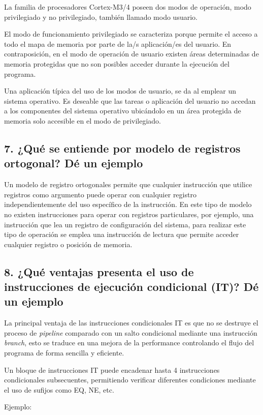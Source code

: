 \documentclass[10pt,a4paper,twoside,spanish]{article}	%
\begin{document}
La familia de procesadores Cortex-M3/4 poseen dos modos de operación, modo privilegiado y no privilegiado, también llamado modo usuario.

El modo de funcionamiento privilegiado se caracteriza porque permite el acceso a todo el mapa de memoria por parte de la/s aplicación/es del usuario. En contraposición, en el modo de operación de usuario existen áreas determinadas de memoria protegidas que no son posibles acceder durante la ejecución del programa.

Una aplicación típica del uso de los modos de usuario, se da al emplear un sistema operativo. Es deseable que las tareas o aplicación del usuario no accedan a los componentes del sistema operativo ubicándolo en un área protegida de memoria solo accesible en el modo de privilegiado.     

\subsection*{7. ¿Qué se entiende por modelo de registros ortogonal? Dé un ejemplo}

Un modelo de registro ortogonales permite que cualquier instrucción que utilice registros como argumento puede operar con cualquier registro independientemente del uso específico de la instrucción. En este tipo de modelo no existen instrucciones para operar con registros particulares, por ejemplo, una instrucción que lea un registro de configuración del sistema, para realizar este tipo de operación se emplea una instrucción de lectura que permite acceder cualquier registro o posición de memoria.


\subsection*{8. ¿Qué ventajas presenta el uso de instrucciones de ejecución condicional (IT)? Dé un ejemplo}

La principal ventaja de las instrucciones condicionales IT es que no se destruye el proceso de \textit{pipeline} comparado con un salto condicional mediante una instrucción \textit{branch}, esto se traduce en una mejora de la performance controlando el flujo del programa de forma sencilla y eficiente.

Un bloque de instrucciones IT puede encadenar hasta 4 instrucciones condicionales subsecuentes, permitiendo verificar diferentes condiciones mediante el uso de sufijos como EQ, NE, etc.

Ejemplo:
\end{document}
